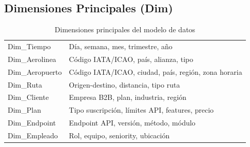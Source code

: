 ﻿\documentclass[11pt, letterpaper]{article}
\begin{document}

\subsection{Dimensiones Principales (Dim)}



\begin{table}[H]

\small

\centering

\begin{tabularx}{\linewidth}{>{\raggedright\arraybackslash}p{4cm} >{\raggedright\arraybackslash}X}

\toprule

\multicolumn{1}{>{\raggedright\arraybackslash}p{4cm}}{\textbf{Dimensión}} &

\multicolumn{1}{>{\raggedright\arraybackslash}X}{\textbf{Uso}} \\

\midrule

Dim\_Tiempo & Día, semana, mes, trimestre, año \\

\midrule

Dim\_Aerolinea & Código IATA/ICAO, país, alianza, tipo \\

\midrule

Dim\_Aeropuerto & Código IATA/ICAO, ciudad, país, región, zona horaria \\

\midrule

Dim\_Ruta & Origen-destino, distancia, tipo ruta \\

\midrule

Dim\_Cliente & Empresa B2B, plan, industria, región \\

\midrule

Dim\_Plan & Tipo suscripción, límites API, features, precio \\

\midrule

Dim\_Endpoint & Endpoint API, versión, método, módulo \\

\midrule

Dim\_Empleado & Rol, equipo, seniority, ubicación \\

\bottomrule

\end{tabularx}

\caption{Dimensiones principales del modelo de datos}

\end{table}
\end{document}
